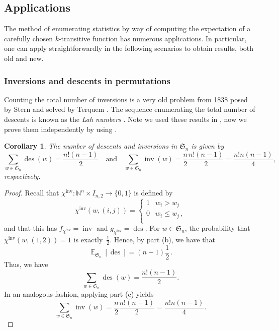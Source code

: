 \documentclass{amsart}
\newcommand{\seqnum}[1]{\href{http://oeis.org/#1}{\underline{#1}}}
\newcommand{\N}{\mathbb{N}}
\renewcommand{\S}{\mathfrak{S}}
\newcommand{\eqpd}{\, .}
\newcommand{\eqcom}{\, ,}
\DeclareMathOperator{\des}{des}
\DeclareMathOperator{\inv}{inv}
\DeclareMathOperator{\E}{\mathbb{E}}
\newtheorem{corollary}[theorem]{Corollary}
\theoremstyle{definition}
\begin{document}
\subsection{Applications}\label{sec:applications-of-linearity-of-expectation}
The method of enumerating statistics by way of computing the expectation of a carefully chosen $k$-transitive function has numerous applications. In particular, one can apply 
 straightforwardly in the following scenarios to obtain results, both old and new.

\subsubsection{Inversions and descents in permutations}
Counting the total number of inversions \cite[\seqnum{A001809}]{OEIS} is a very old problem from 1838 posed by Stern \cite{Stern_1838} and solved by Terquem \cite{Terquem1838}. 
The sequence enumerating the total number of descents is known as the \textit{Lah numbers} \cite[\seqnum{A001286}]{OEIS}. Note we used these results in , now we prove them independently by using .
\begin{corollary}
    \label{thm:inversions-and-decents-in-permutations}The number of descents and inversions in $\S_n$ is given by 
    \[\sum_{w\in \S_n}\des(w)=\frac{n!(n-1)}{2}\quad \text{and}\quad \sum_{w\in \S_n}\inv(w)=\frac{n}{2}\frac{n!(n-1)}{2}=\frac{n!n(n-1)}{4},
    \]
    respectively.
\end{corollary}
\begin{proof}
Recall that $\chi^{\inv}:\N^n\times I_{n,2}\to \{0,1\}$ is defined by 
\[\chi^{\inv}(w,(i,j))=\begin{cases}
    1&w_i>w_j\\
    0&w_i\leq w_j \eqcom\\
\end{cases}\]
and that this has $f_{\chi^{\inv}}=\inv$ and $g_{\chi^{\inv}}=\des$. 
For $w\in \S_n$, the probability that $\chi^{\inv}(w,(1,2))=1$ is exactly~$\frac12$. Hence, by  part (b), we have that 
\[\E_{\S_n}[\des]=(n-1)\frac{1}{2} \eqpd \]
Thus, we have
\[\sum_{w\in \S_n}\des(w)=\frac{n!(n-1)}{2}.\]
In an analogous fashion, 
applying   part (c) yields
\[\sum_{w\in \S_n}\inv(w)=\frac{n}{2}\frac{n!(n-1)}{2}=\frac{n!n(n-1)}{4}.\]
\end{proof}
\end{document}
